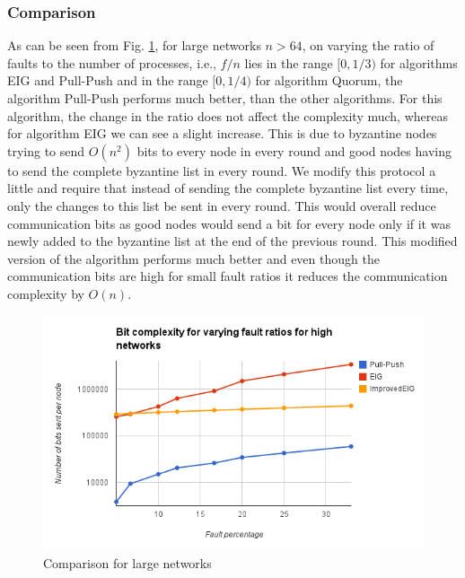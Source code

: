 \subsubsection{Comparison}
As can be seen from Fig. \ref{fig:comp}, for large networks $n > 64$, on varying the ratio of faults to the number of processes, i.e., $f/n$ lies in the range $[0, 1/3)$ for algorithms EIG and Pull-Push and in the range $[0, 1/4)$ for algorithm Quorum, the algorithm Pull-Push performs much better, than the other algorithms. For this algorithm, the change in the ratio does not affect the complexity much, whereas for algorithm EIG we can see a slight increase. This is due to byzantine nodes trying to send $O(n^2)$ bits to every node in every round and good nodes having to send the complete byzantine list in every round. We modify this protocol a little and require that instead of sending the complete byzantine list every time, only the changes to this list be sent in every round. This would overall reduce communication bits as good nodes would send a bit for every node only if it was newly added to the byzantine list at the end of the previous round. This modified version of the algorithm performs much better and even though the communication bits are high for small fault ratios it reduces the communication complexity by $O(n)$. 
\begin{figure}[h]
 \centering
\includegraphics[scale=0.4]{LargeNetBit}
\caption{Comparison for large networks}
 \label{fig:comp}
\end{figure}

